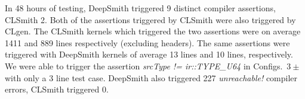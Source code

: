 In 48 hours of testing, DeepSmith triggered 9 distinct compiler assertions, CLSmith 2. Both of the assertions triggered by CLSmith were also triggered by CLgen.
% 
%
%
The CLSmith kernels which triggered the two assertions were on average 1411 and 889 lines respectively (excluding headers). The same assertions were triggered with DeepSmith kernels of average 13 lines and 10 lines, respectively.
%
We were able to trigger the assertion \emph{srcType != ir::TYPE\_U64} in Configs.\ $3\pm$ with only a 3 line test case.
%
DeepSmith also triggered 227 \emph{unreachable!} compiler errors, CLSmith triggered 0.



